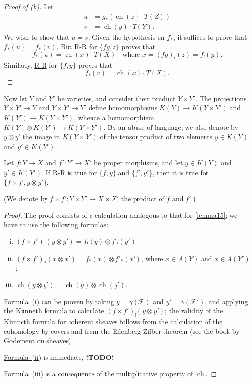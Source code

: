 \documentclass{article}
\theoremstyle{plain}
\newenvironment{lemma}[1]
    {\renewcommand\theinnercustomlemma{#1}\innercustomlemma}
    {\endinnercustomlemma}
\theoremstyle{definition}
\newcommand{\sh}{\mathscr}
\DeclareMathOperator{\ch}{ch}
\newcommand{\todo}{\textbf{ !TODO! }}
\newcommand{\oldpage}[1]{\marginpar{\footnotesize$\Big\vert$ \textit{p.~#1}}}
\begin{document}
\begin{proof}[Proof of (b)]
  Let
  \begin{align*}
    u &= g_*(\ch(z)\cdot T(Z))
  \\v &= \ch(y)\cdot T(Y).
  \end{align*}
  We wish to show that $u=v$.
  Given the hypothesis on $f_*$, it suffices to prove that $f_*(u)=f_*(v)$.
  But \hyperref[theoremriemannroch]{R-R} for $\{fg,z\}$ proves that
  \[
    f_*(u) = \ch(x)\cdot T(X)
    \quad
    \mbox{where $x=(fg)_!(z)=f_!(y)$.}
  \]
  Similarly, \hyperref[theoremriemannroch]{R-R} for $\{f,y\}$ proves that
  \[
    f_*(v) = \ch(x)\cdot T(X).
  \]
\end{proof}

Now let $Y$ and $Y'$ be varieties, and consider their product $Y\times Y'$.
The projections $Y\times Y'\to Y$ and $Y\times Y'\to Y'$ define homomorphisms $K(Y)\to K(Y\times Y')$ and $K(Y')\to K(Y\times Y')$, whence a homomorphism $K(Y)\otimes K(Y')\to K(Y\times Y')$.
By an abuse of language, we also denote by $y\otimes y'$ the image in $K(Y\times Y')$ of the tensor product of two elements $y\in K(Y)$ and $y'\in K(Y')$.

\begin{lemma}{16}
\label{lemma16}
  Let $f\colon Y\to X$ and $f'\colon Y'\to X'$ be proper morphisms, and let $y\in K(Y)$ and $y'\in K(Y')$.
  If \hyperref[theoremriemannroch]{R-R} is true for $\{f,y\}$ and $\{f',y'\}$, then it is true for $\{f\times f',y\otimes y'\}$.
\end{lemma}

(We denote by $f\times f'\colon Y\times Y'\to X\times X'$ the product of $f$ and $f'$.)

\begin{proof}
  The proof consists of a calculation analogous to that for \cref{lemma15};
  we have to use the following formulas:
  \begin{enumerate}[(i)]
    \item $(f\times f')_!(y\otimes y') = f_!(y)\otimes f'_!(y')$;
      \label{lemma16equation1}
    \item $(f\times f')_*(x\otimes x') = f_*(x)\otimes f'_*(x')$, where $x\in A(Y)$ and $x\in A(Y')$;
      \label{lemma16equation2}
    \item $\ch(y\otimes y') = \ch(y)\otimes\ch(y')$.
      \label{lemma16equation3}
  \end{enumerate}

  \hyperref[lemma16equation1]{Formula~(i)} can be proven by taking $y=\gamma(\sh{F})$ and $y'=\gamma(\sh{F}')$, and applying the K\"{u}nneth formula to calculate $(f\times f')_!(y\otimes y')$;
  the validity of the K\"{u}nneth formula for coherent sheaves follows from the calculation of the cohomology by covers and from the Eilenberg-Zilber theorem (see the book by Godement on sheaves).

  \hyperref[lemma16equation2]{Formula~(ii)} is immediate, \todo

  \oldpage{115}
  \hyperref[lemma16equation3]{Formula~(iii)} is a consequence of the multiplicative property of $\ch$.
\end{proof}
\end{document}
